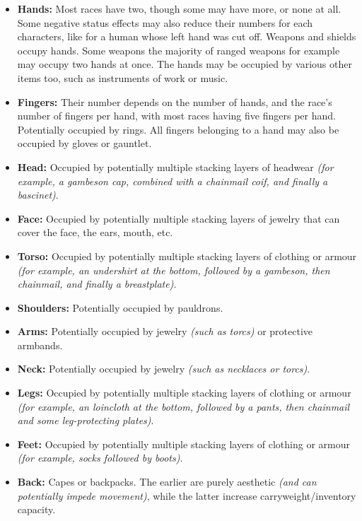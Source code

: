 \documentclass[openany,11pt,a4paper]{book}
\begin{document}
\begin{itemize}
\item \textbf{Hands:} Most races have two, though some may have more, or none at all. Some negative status effects may also reduce their numbers for each characters, like for a human whose left hand was cut off. Weapons and shields occupy hands. Some weapons \textemdash the majority of ranged weapons for example \textemdash may occupy two hands at once. The hands may be occupied by various other items too, such as instruments of work or music.
\item \textbf{Fingers:} Their number depends on the number of hands, and the race's number of fingers per hand, with most races having five fingers per hand. Potentially occupied by rings. All fingers belonging to a hand may also be occupied by gloves or gauntlet.
\item \textbf{Head:} Occupied by potentially multiple stacking layers of headwear \textit{(for example, a gambeson cap, combined with a chainmail coif, and finally a bascinet)}.
\item \textbf{Face:} Occupied by potentially multiple stacking layers of jewelry that can cover the face, the ears, mouth, etc.
\item \textbf{Torso:} Occupied by potentially multiple stacking layers of clothing or armour \textit{(for example, an undershirt at the bottom, followed by a gambeson, then chainmail, and finally a breastplate)}.
\item \textbf{Shoulders:} Potentially occupied by pauldrons.
\item \textbf{Arms:} Potentially occupied by jewelry \textit{(such as torcs)} or protective armbands.
\item \textbf{Neck:} Potentially occupied by jewelry \textit{(such as necklaces or torcs)}.
\item \textbf{Legs:} Occupied by potentially multiple stacking layers of clothing or armour \textit{(for example, an loincloth at the bottom, followed by a pants, then chainmail and some leg-protecting plates)}.
\item \textbf{Feet:} Occupied by potentially multiple stacking layers of clothing or armour \textit{(for example, socks followed by boots)}.
\item \textbf{Back:} Capes or backpacks. The earlier are purely aesthetic \textit{(and can potentially impede movement)}, while the latter increase carryweight/inventory capacity.
\end{itemize}
\end{document}
